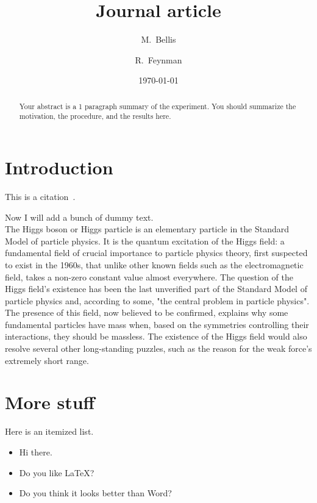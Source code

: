 \documentclass[twocolumn]{revtex4}
\begin{document}
\title{
Journal article
}

\author{M.~Bellis}
\author{R.~Feynman}

\date{\today}

\begin{abstract}
    Your abstract is a 1 paragraph summary of the experiment.
    You should summarize the motivation, the procedure, and the 
    results here.
\end{abstract}

\maketitle

\section{Introduction}
This is a citation~\cite{Feynman:1969ej}.

Now I will add a bunch of dummy text.\\

The Higgs boson or Higgs particle is an elementary particle in the Standard Model of particle physics. It is the quantum excitation of the Higgs field: a fundamental field of crucial importance to particle physics theory, first suspected to exist in the 1960s, that unlike other known fields such as the electromagnetic field, takes a non-zero constant value almost everywhere. The question of the Higgs field's existence has been the last unverified part of the Standard Model of particle physics and, according to some, "the central problem in particle physics". The presence of this field, now believed to be confirmed, explains why some fundamental particles have mass when, based on the symmetries controlling their interactions, they should be massless. The existence of the Higgs field would also resolve several other long-standing puzzles, such as the reason for the weak force's extremely short range.


\section{More stuff}
Here is an itemized list.
\begin{itemize}
    \item Hi there. 
    \item Do you like \LaTeX?
    \item Do you think it looks better than Word?
\end{itemize}
\end{document}
